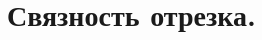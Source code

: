 \documentclass[geometry.tex]{subfiles}
\begin{document}
  \section{Связность отрезка.}
\end{document}
